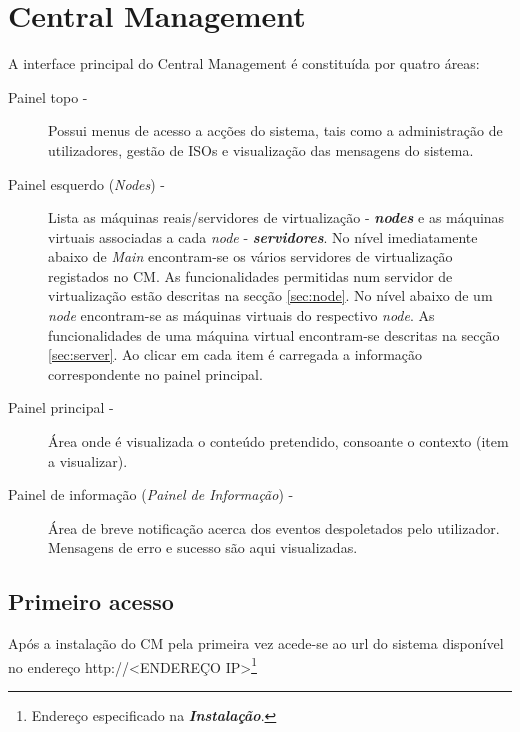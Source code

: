 
\chapter{\textsf{Central Management}}

A interface principal do Central Management é constituída por quatro áreas:

\begin{description}
	\item[Painel topo -] Possui menus de acesso a acções do sistema, tais como a administração de utilizadores, gestão de ISOs e visualização das mensagens do sistema.
	\item[Painel esquerdo (\emph{Nodes}) -] Lista as máquinas reais/servidores de virtualização - {\bf\emph{nodes}} e as máquinas virtuais associadas a cada \emph{node} - {\bf\emph{servidores}}. No nível imediatamente abaixo de \emph{Main} encontram-se os vários servidores de virtualização registados no CM. As funcionalidades permitidas num servidor de virtualização estão descritas na secção \ref{sec:node}. No nível abaixo de um \emph{node} encontram-se as máquinas virtuais do respectivo \emph{node}. As funcionalidades de uma máquina virtual encontram-se descritas na secção \ref{sec:server}. Ao clicar em cada item é carregada a informação correspondente no painel principal.
	\item[Painel principal -] Área onde é visualizada o conteúdo pretendido, consoante o contexto (item a visualizar).
	\item[Painel de informação (\emph{Painel de Informação}) -] Área de breve notificação acerca dos eventos despoletados pelo utilizador. Mensagens de erro e sucesso são aqui visualizadas.
\end{description}


\pagebreak


\section{Primeiro acesso}
\label{sec:first_access}
Após a instalação do CM pela primeira vez acede-se ao url do sistema disponível no endereço http://<ENDEREÇO IP>\footnote{Endereço especificado na {\bf \emph{Instalação}}.}

